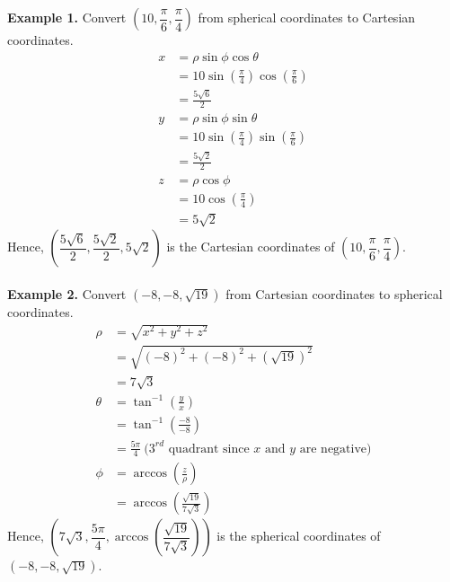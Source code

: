 \noindent\textbf{Example 1. } Convert $\left(10, \dfrac{\pi}{6}, \dfrac{\pi}{4}\right)$ from spherical coordinates to Cartesian coordinates.
\begin{align*}
    x & = \rho\sin\phi\cos\theta                                         \\
      & = 10\sin\left(\frac{\pi}{4}\right)\cos\left(\frac{\pi}{6}\right) \\
      & = \frac{5\sqrt{6}}{2}                                            \\
    y & = \rho\sin\phi\sin\theta                                         \\
      & = 10\sin\left(\frac{\pi}{4}\right)\sin\left(\frac{\pi}{6}\right) \\
      & = \frac{5\sqrt{2}}{2}                                            \\
    z & = \rho\cos\phi                                                   \\
      & = 10\cos\left(\frac{\pi}{4}\right)                               \\
      & = 5\sqrt{2}
\end{align*}
Hence, $\left(\dfrac{5\sqrt{6}}{2}, \dfrac{5\sqrt{2}}{2}, 5\sqrt{2}\right)$ is the Cartesian coordinates of $\left(10, \dfrac{\pi}{6}, \dfrac{\pi}{4}\right)$.
~\\\\
\noindent\textbf{Example 2. } Convert $\left(-8, -8, \sqrt{19}\right)$ from Cartesian coordinates to spherical coordinates.
\begin{align*}
    \rho   & = \sqrt{x^2 + y^2 + z^2}                                                    \\
           & = \sqrt{(-8)^2 + (-8)^2 + \left(\sqrt{19}\right)^2}                         \\
           & = 7\sqrt{3}                                                                 \\
    \theta & = \tan^{-1}\left(\frac{y}{x}\right)                                         \\
           & = \tan^{-1}\left(\frac{-8}{-8}\right)                                       \\
           & = \frac{5\pi}{4}\ \text{($3^{rd}$ quadrant since $x$ and $y$ are negative)} \\
    \phi   & = \arccos\left(\frac{z}{\rho}\right)                                        \\
           & = \arccos\left(\frac{\sqrt{19}}{7\sqrt{3}}\right)
\end{align*}
Hence, $\left(7\sqrt{3}, \dfrac{5\pi}{4}, \arccos\left(\dfrac{\sqrt{19}}{7\sqrt{3}}\right)\right)$ is the spherical coordinates of $\left(-8, -8, \sqrt{19}\right)$.
